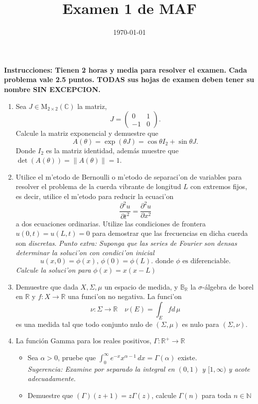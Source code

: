 \documentclass[letterpaper]{article}
\date{\today}
\title{Examen 1 de MAF}
\newcommand{\nat}{\ensuremath{ \mathbb N }}
\newcommand{\sig}{\ensuremath{\Sigma}}
\newcommand{\co}{\ensuremath{\mathbb C }}
\newcommand{\re}{\ensuremath{\mathbb R }}
\begin{document}
\maketitle

\noindent\textbf{Instrucciones: Tienen 2 horas y media para resolver el examen. Cada problema vale 2.5 puntos. TODAS sus hojas de examen deben tener su nombre SIN EXCEPCION.}

\begin{enumerate}
\item Sea \(J\in\textrm{M}_{2\times 2}(\co)\) la matriz,
\[
      J=\begin{pmatrix} 0 & 1\\
                       -1 & 0
        \end{pmatrix}.
\]
Calcule la matriz exponencial y demuestre que
\[
        A(\theta)=\exp(\theta J)=\cos\theta I_{2} + \sin\theta J.
   \]
Donde \(I_{2}\) es la matriz identidad, además muestre que \(\det(A(\theta))=\|A(\theta)\|=1\).
\item Utilice el m'etodo de Bernoulli o m'etodo de separaci'on de variables para resolver el problema de la cuerda vibrante de longitud \(L\) con extremos fijos, es decir, utilice el m'etodo para reducir la ecuaci'on
  \[
  \dfrac{\partial^{2} u}{\partial t^{2}}=\dfrac{\partial^{2}u}{\partial x^{2}}
  \]
  a dos ecuaciones ordinarias. Utilize las condiciones de frontera \(u(0,t)=u(L,t)=0\) para demostrar que las frecuencias en dicha cuerda son \emph{discretas}.
\noindent\emph{Punto extra: Suponga que las series de Fourier son densas determinar la soluci'on con condici'on inicial
  \[
  u(x,0)=\phi(x),\,\phi(0)=\phi(L).\text{ donde $\phi$ es diferenciable.}
  \]
 Calcule la soluci'on para $\phi(x)=x(x-L)$}
\item Demuestre que dada \(X,\sig,\mu\) un espacio de medida, y \(\mathbb{B}_{\re}\) la \(\sigma\)-álgebra de borel en \(\re\) y \(f:X\to\re\) una funci'on no negativa. La funci'on
\[
\nu:\sig\to\re\quad\nu(E)=\int_{E}fd\,\mu
\]
es una medida tal que todo conjunto nulo de \((\sig,\mu)\) es nulo para \((\sig,\nu)\).
\item La función Gamma para los reales positivos, \(\Gamma:\re^{+}\to\re\)
  \begin{itemize}
    \item Sea \(\alpha>0\), pruebe que \(\int_0^{\infty}e^{-x}x^{\alpha-1}\,dx=\Gamma(\alpha)\) existe.\\
    \emph{Sugerencia: Examine por separado la integral en \((0,1)\) y \([1,\infty)\) y acote adecuadamente}.

    \item Demuestre que \((\Gamma)(z+1)=z\Gamma(z)\), calcule \(\Gamma(n)\) para toda \(n\in\nat\)
    \end{itemize}

\end{enumerate}
\end{document}
